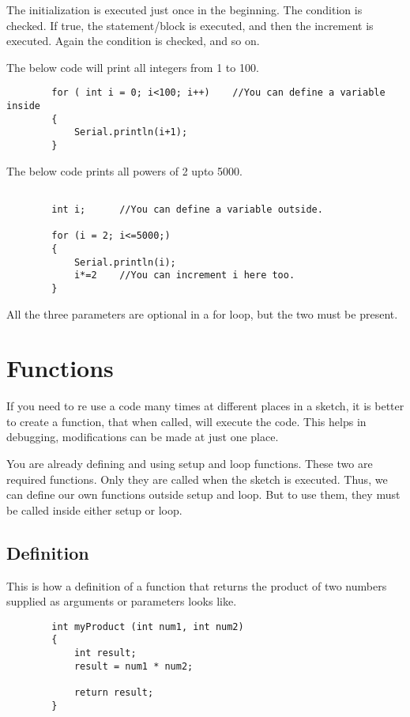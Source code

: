 \documentclass{article}
\begin{document}
		The initialization is executed just once in the beginning. The condition is checked. If true, the statement/block is executed, and then the increment is executed. Again the condition is checked, and so on.

		The below code will print all integers from 1 to 100.

		\begin{lstlisting}
		for ( int i = 0; i<100; i++)	//You can define a variable inside
		{
			Serial.println(i+1);
		}
		\end{lstlisting}

		The below code prints all powers of 2 upto 5000.

		\begin{lstlisting}

		int i; 		//You can define a variable outside.

		for (i = 2; i<=5000;)
		{
			Serial.println(i);
			i*=2	//You can increment i here too.
		}
		\end{lstlisting}

		All the three parameters are optional in a for loop, but the two \inlncd{;} must be present.

\section{Functions}
	
	If you need to re use a code many times at different places in a sketch, it is better to create a function, that when called, will execute the code. This helps in debugging, modifications can be made at just one place.

	You are already defining and using setup and loop functions. These two are required functions. Only they are called when the sketch is executed. Thus, we can define our own functions outside setup and loop. But to use them, they must be called inside either setup or loop.

	\subsection{Definition}

		This is how a definition of a function that returns the product of two numbers supplied as arguments or parameters looks like.

		\begin{lstlisting}
		int myProduct (int num1, int num2)
		{
			int result;
			result = num1 * num2;

			return result;
		}
		\end{lstlisting}
\end{document}
